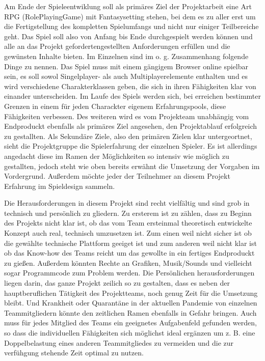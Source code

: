 Am Ende der Spieleentwiklung soll als primäres Ziel der Projektarbeit eine Art RPG (RolePlayingGame) mit Fantasysetting stehen, bei dem es zu aller erst um die Fertigstellung des kompletten Spielumfangs und nicht nur einiger Teilbereiche geht. Das Spiel soll also von Anfang bis Ende durchgespielt werden können und alle an das Projekt gefordertengestellten Anforderungen erfüllen und die gewünsten Inhalte bieten. Im Einzelnen sind im o. g. Zusammenhang folgende Dinge zu nennen. Das Spiel muss mit einem gängigem Browser online spielbar sein, es soll sowol Singelplayer- als auch Multiplayerelemente enthalten und es wird verschiedene Charakterklassen geben, die sich in ihren Fähigkeiten klar von einander unterscheiden. Im Laufe des Spiels werden sich, bei erreichen bestimmter Grenzen in einem für jeden Charackter eigenem Erfahrungspools, diese Fähigkeiten verbessen. Des weiteren wird es vom Projekteam unabhängig vom Endproduckt ebenfalls als primäres Ziel angesehen, den Projektablauf erfolgreich zu gestallten.
Als Sekundäre Ziele, also den primären Zielen klar untergeortnet, sieht die Projektgruppe die Spielerfahrung der einzelnen Spieler. Es ist allerdings angedacht diese im Ramen der Möglichkeiten so intensiv wie möglich zu gestallten, jedoch steht wie oben bereits erwähnt die Umsetzung der Vorgaben im Vordergrund. Außerdem möchte jeder der Teilnehmer an diesem Projekt Erfahrung im Spieldesign sammeln.

Die Herausforderungen in diesem Projekt sind recht vielfältig und sind grob in technisch und persönlich zu gliedern. Zu ersterem ist zu zählen, dass zu Beginn des Projekts nicht klar ist, ob das vom Team ersteinmal theoretisch entwickelte Konzept auch real, technisch umzusetzen ist. Zum einen weil nicht sicher ist ob die gewählte technische Plattform geeiget ist und zum anderen weil nicht klar ist ob das Know-how des Teams reicht um das gewollte in ein fertiges Endproduckt zu gießen. Außerdem könnten Rechte an Grafiken, Musik/Sounds und vielleicht sogar Programmcode zum Problem werden. Die Persönlichen herausforderungen liegen darin, das ganze Projekt zeilich so zu gestalten, dass es neben der hauptberuflichen Tätigkeit des Projektteams, noch genug Zeit für die Umsetzung bleibt. Und Krankheit oder Quarantäne in der aktuellen Pandemie von einzelnen Teammitgliedern könnte den zeitlichen Ramen ebenfalls in Gefahr bringen. Auch muss für jedes Mitglied des Teams ein geeignetes Aufgabenfeld gefunden werden, so dass die individuellen Fähigkeiten sich möglichst ideal ergänzen um z. B. eine Doppelbelastung eines anderen Teammitgliedes zu vermeiden und die zur verfühgung stehende Zeit optimal zu nutzen. 



